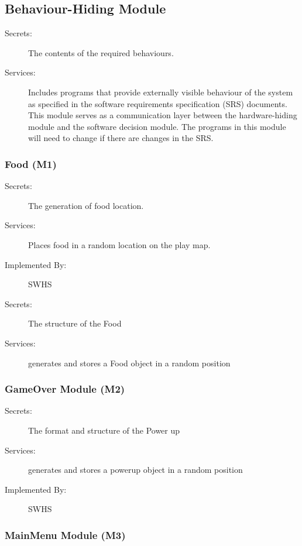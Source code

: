 \documentclass[12pt]{article}
\begin{document}
\subsection{Behaviour-Hiding Module}

\begin{description}
\item[Secrets:]The contents of the required behaviours.
\item[Services:]Includes programs that provide externally visible behaviour of
  the system as specified in the software requirements specification (SRS)
  documents. This module serves as a communication layer between the
  hardware-hiding module and the software decision module. The programs in this
  module will need to change if there are changes in the SRS.
\end{description}

\subsubsection{Food (M1)}


\begin{description}

\item[Secrets:] The generation of food location.
\item[Services:] Places food in a random location on the play map.
\item[Implemented By:] SWHS
\item[Secrets:]The structure of the Food
\item[Services:]generates and stores a Food object in a random position

\end{description}

\subsubsection{GameOver Module (M2)}


\begin{description}

\item[Secrets:]The format and structure of the Power up
\item[Services:]generates and stores a powerup object in a random position
\item[Implemented By:] SWHS
\end{description}

\subsubsection{MainMenu Module (M3)}
\end{document}
